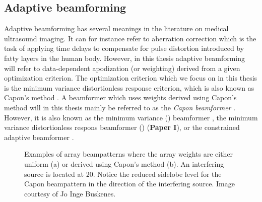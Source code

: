\subsection{Adaptive beamforming}\label{sec:adaptbf}
Adaptive beamforming has several meanings in the literature on medical ultrasound imaging. It can for instance refer to aberration correction \cite{cole1996method} which is the task of applying time delays to compensate for pulse distortion introduced by fatty layers in the human body. However, in this thesis adaptive beamforming will refer to data-dependent apodization (or weighting) derived from a given optimization criterion. The optimization criterion which we focus on in this thesis is the minimum variance distortionless response criterion, which is also known as Capon's method \cite{Capon1969}. A beamformer which uses weights derived using Capon's method will in this thesis mainly be referred to as the \textit{Capon beamformer} \cite{Vignon2008}. However, it is also known as the minimum variance  () beamformer \cite{Synnevag2007}, the minimum variance distortionless respons beamformer () (\textbf{Paper I}), or the constrained adaptive beamformer \cite{Mann2002}.

\begin{figure}[t!]
\caption{Examples of array beampatterns where the array weights are either uniform (a) or derived using Capon's method (b). An interfering source is located at 20\degree. Notice the reduced sidelobe level for the Capon beampattern in the direction of the interfering source. Image courtesy of Jo Inge Buskenes.}
\label{fig:weights}
\end{figure}

